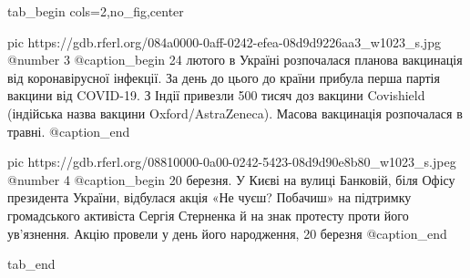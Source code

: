  
 
 
 
 


\ifcmt
  tab_begin cols=2,no_fig,center

     pic https://gdb.rferl.org/084a0000-0aff-0242-efea-08d9d9226aa3_w1023_s.jpg
		 @number 3
		 @caption_begin
24 лютого в Україні розпочалася планова вакцинація від коронавірусної інфекції.
За день до цього до країни прибула перша партія вакцини від COVID-19. З Індії
привезли 500 тисяч доз вакцини Covishield (індійська назва вакцини
Oxford/AstraZeneca). Масова вакцинація розпочалася в травні.
		 @caption_end

		 pic https://gdb.rferl.org/08810000-0a00-0242-5423-08d9d90e8b80_w1023_s.jpeg
		 @number 4
		 @caption_begin
20 березня. У Києві на вулиці Банковій, біля Офісу президента України,
відбулася акція «Не чуєш? Побачиш» на підтримку громадського активіста Сергія
Стерненка й на знак протесту проти його ув’язнення. Акцію провели у день його
народження, 20 березня 
		 @caption_end

  tab_end
\fi
